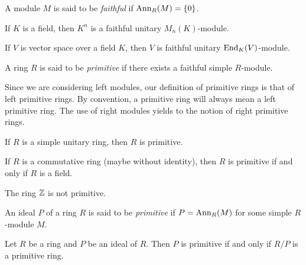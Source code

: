 
\begin{definition}
A module $M$ is said to be \emph{faithful} if $\operatorname{Ann}_R(M)=\{0\}$. 
\end{definition}

\begin{example}
	If $K$ is a field, then $K^n$ is a faithful unitary $M_n(K)$-module.
\end{example}

\begin{example}
	If $V$ is vector space over a field $K$, then $V$ is faithful unitary $\operatorname{End}_K(V)$-module.
\end{example}

\begin{definition}
A ring $R$ is said to be \emph{primitive} if there exists a faithful simple $R$-module.  
\end{definition}

Since 
we are considering left modules, our definition of primitive rings is that of left primitive rings.
By convention, a primitive ring
will always mean a left primitive ring. 
The use 
of right modules yields to the notion of right primitive rings.  

\begin{exercise}
	\label{xca:simple=>prim}
	If $R$ is a simple unitary ring, then $R$ is primitive. 
\end{exercise}

\begin{exercise}
	\label{xca:prim+conm=cuerpo}
	If $R$ is a commutative ring (maybe without identity), then $R$ is primitive if and only if $R$ is a field. 
\end{exercise}

\begin{example}
	The ring $\mathbb{Z}$ is not primitive. 
\end{example}

\begin{definition}
An ideal $P$ of a ring $R$ is said to be \emph{primitive} if $P=\operatorname{Ann}_R(M)$
for some simple $R$-module $M$. 
\end{definition}

\begin{lemma}
	\label{lemma:primitivo}
	Let $R$ be a ring and $P$ be an ideal of $R$. Then $P$ is primitive if and only if 
	$R/P$ is a primitive ring.
\end{lemma}

